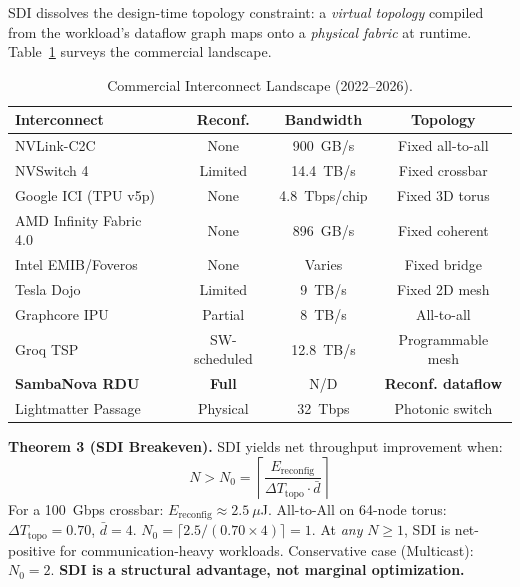 ﻿\documentclass[review,3p,twocolumn]{elsarticle}
\begin{document}
SDI dissolves the design-time topology constraint: a \emph{virtual topology} compiled from the workload's dataflow graph maps onto a \emph{physical fabric} at runtime. Table~\ref{tab:commercial} surveys the commercial landscape.

\begin{table}[h]
\centering
\caption{Commercial Interconnect Landscape (2022--2026).}
\label{tab:commercial}
\begin{tabular}{lccc}
\toprule
\textbf{Interconnect} & \textbf{Reconf.} & \textbf{Bandwidth} & \textbf{Topology} \\
\midrule
NVLink-C2C~\cite{nvidia2025} & None & 900~GB/s & Fixed all-to-all \\
NVSwitch 4~\cite{nvswitch2024} & Limited & 14.4~TB/s & Fixed crossbar \\
Google ICI (TPU v5p)~\cite{google2023} & None & 4.8~Tbps/chip & Fixed 3D torus \\
AMD Infinity Fabric 4.0~\cite{amd2024} & None & 896~GB/s & Fixed coherent \\
Intel EMIB/Foveros~\cite{intel2024} & None & Varies & Fixed bridge \\
Tesla Dojo~\cite{tesla2022} & Limited & 9~TB/s & Fixed 2D mesh \\
Graphcore IPU~\cite{graphcore2023} & Partial & 8~TB/s & All-to-all \\
Groq TSP~\cite{groq2024} & SW-scheduled & 12.8~TB/s & Programmable mesh \\
\textbf{SambaNova RDU}~\cite{sambanova2026} & \textbf{Full} & N/D & \textbf{Reconf. dataflow} \\
Lightmatter Passage~\cite{lightmatter2025} & Physical & 32~Tbps & Photonic switch \\
\bottomrule
\end{tabular}
\end{table}

\textbf{Theorem 3 (SDI Breakeven).} SDI yields net throughput improvement when:
\begin{equation}
N > N_0 = \left\lceil \frac{E_{\text{reconfig}}}{\Delta T_{\text{topo}} \cdot \bar{d}} \right\rceil
\label{eq:breakeven}
\end{equation}
For a 100~Gbps crossbar: $E_{\text{reconfig}} \approx 2.5~\mu$J. All-to-All on 64-node torus: $\Delta T_{\text{topo}} = 0.70$, $\bar{d}=4$. $N_0 = \lceil 2.5 / (0.70 \times 4) \rceil = 1$. At \emph{any} $N \geq 1$, SDI is net-positive for communication-heavy workloads. Conservative case (Multicast): $N_0 = 2$. \textbf{SDI is a structural advantage, not marginal optimization.}
\end{document}
